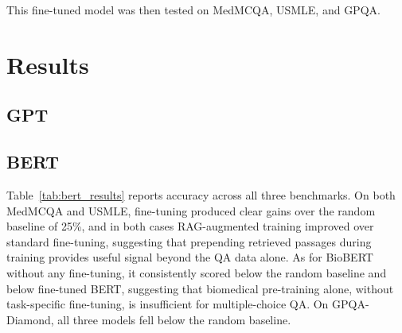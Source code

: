 \documentclass{article}
\begin{document}
This fine-tuned model was then tested on MedMCQA, USMLE, and GPQA.

\section{Results}

\subsection{GPT}

\subsection{BERT}

Table~\ref{tab:bert_results} reports accuracy across all three benchmarks. On both MedMCQA and USMLE, fine-tuning produced clear gains over the random baseline of 25\%, and in both cases RAG-augmented training improved over standard fine-tuning, suggesting that prepending retrieved passages during training provides useful signal beyond the QA data alone. As for BioBERT without any fine-tuning, it consistently scored below the random baseline and below fine-tuned BERT, suggesting that biomedical pre-training alone, without task-specific fine-tuning, is insufficient for multiple-choice QA. On GPQA-Diamond, all three models fell below the random baseline.

\begin{table}[h]
    \centering
    \caption{Accuracy on MedMCQA, USMLE and GPQA
        Random chance is 25\% for all benchmarks.}
    \label{tab:bert_results}
\end{table}
\end{document}
